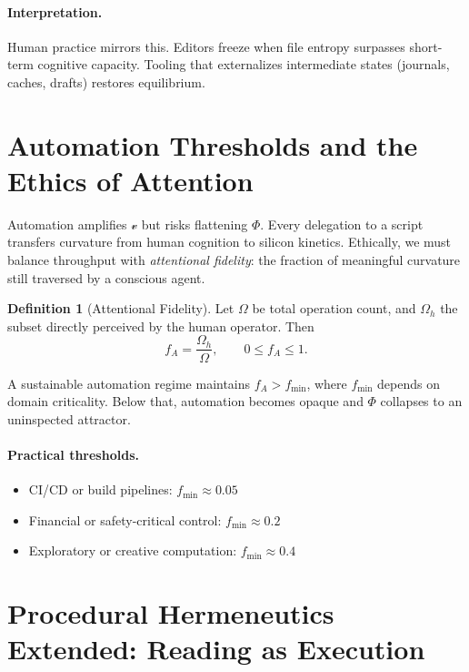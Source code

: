 \documentclass[12pt,a4paper]{article}
\theoremstyle{plain}
\theoremstyle{definition}
\newtheorem{definition}[theorem]{Definition}
\theoremstyle{remark}
\newcommand{\Phifield}{\Phi}
\newcommand{\vfield}{\mathcal{v}}
\begin{document}
\paragraph{Interpretation.}
Human practice mirrors this. Editors freeze when file entropy surpasses short-term cognitive capacity. Tooling that externalizes intermediate states (journals, caches, drafts) restores equilibrium.

\section{Automation Thresholds and the Ethics of Attention}
\label{sec:automation-ethics}

Automation amplifies $\vfield$ but risks flattening $\Phifield$. Every delegation to a script transfers curvature from human cognition to silicon kinetics. Ethically, we must balance throughput with \emph{attentional fidelity}: the fraction of meaningful curvature still traversed by a conscious agent.

\begin{definition}[Attentional Fidelity]
Let $\Omega$ be total operation count, and $\Omega_h$ the subset directly perceived by the human operator. Then
\[
f_A = \frac{\Omega_h}{\Omega}, \qquad 0\le f_A\le 1.
\]
\end{definition}

A sustainable automation regime maintains $f_A>f_{\min}$, where $f_{\min}$ depends on domain criticality. Below that, automation becomes opaque and $\Phifield$ collapses to an uninspected attractor.

\paragraph{Practical thresholds.}
\begin{itemize}
  \item CI/CD or build pipelines: $f_{\min}\approx0.05$
  \item Financial or safety-critical control: $f_{\min}\approx0.2$
  \item Exploratory or creative computation: $f_{\min}\approx0.4$
\end{itemize}

\section{Procedural Hermeneutics Extended: Reading as Execution}
\label{sec:hermeneutics-extended}
\end{document}
